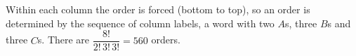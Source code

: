 Within each column the order is forced (bottom to top), so an order is determined by the sequence of column labels, a word with two $A$s, three $B$s and three $C$s. There are $\dfrac{8!}{2!\,3!\,3!}=\boxed{560}$ orders.

